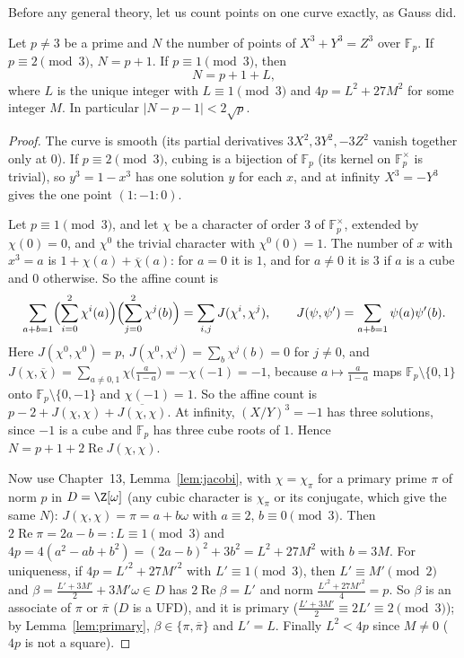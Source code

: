 Before any general theory, let us count points on one curve exactly, as Gauss did.

\begin{proposition}[Gauss]\label{prop:gausscubic}
Let $p\ne3$ be a prime and $N$ the number of points of $X^3+Y^3=Z^3$ over $\mathbb F_p$. If $p\equiv2\pmod3$, $N=p+1$. If $p\equiv1\pmod3$, then
\[
N=p+1+L,
\]
where $L$ is the unique integer with $L\equiv1\pmod3$ and $4p=L^2+27M^2$ for some integer $M$. In particular $|N-p-1|<2\sqrt p$.
\end{proposition}
\begin{proof}
The curve is smooth (its partial derivatives $3X^2,3Y^2,-3Z^2$ vanish together only at $0$). If $p\equiv2\pmod3$, cubing is a bijection of $\mathbb F_p$
(its kernel on $\mathbb F_p^\times$ is trivial), so $y^3=1-x^3$ has one solution $y$ for each $x$, and at infinity $X^3=-Y^3$ gives the one point $(1:-1:0)$.

Let $p\equiv1\pmod3$, and let $\chi$ be a character of order $3$ of $\mathbb F_p^\times$, extended by $\chi(0)=0$, and $\chi^0$ the trivial character with
$\chi^0(0)=1$. The number of $x$ with $x^3=a$ is $1+\chi(a)+\overline\chi(a)$: for $a=0$ it is $1$, and for $a\ne0$ it is $3$ if $a$ is a cube and $0$ otherwise.
So the affine count is
\[
\sum_{a+b=1}\Bigl(\sum_{i=0}^2\chi^i(a)\Bigr)\Bigl(\sum_{j=0}^2\chi^j(b)\Bigr)=\sum_{i,j}J(\chi^i,\chi^j),\qquad J(\psi,\psi')=\sum_{a+b=1}\psi(a)\psi'(b).
\]
Here $J(\chi^0,\chi^0)=p$, $J(\chi^0,\chi^j)=\sum_b\chi^j(b)=0$ for $j\ne0$, and $J(\chi,\overline\chi)=\sum_{a\ne0,1}\chi\bigl(\frac a{1-a}\bigr)=-\chi(-1)=-1$,
because $a\mapsto\frac a{1-a}$ maps $\mathbb F_p\setminus\{0,1\}$ onto $\mathbb F_p\setminus\{0,-1\}$ and $\chi(-1)=1$. So the affine count is
$p-2+J(\chi,\chi)+\overline{J(\chi,\chi)}$. At infinity, $(X/Y)^3=-1$ has three solutions, since $-1$ is a cube and $\mathbb F_p$ has three cube roots of $1$.
Hence $N=p+1+2\operatorname{Re}J(\chi,\chi)$.

Now use Chapter~13, Lemma~\ref{lem:jacobi}, with $\chi=\chi_\pi$ for a primary prime $\pi$ of norm $p$ in $D=\Z[\omega]$ (any cubic character is $\chi_\pi$ or its
conjugate, which give the same $N$): $J(\chi,\chi)=\pi=a+b\omega$ with $a\equiv2$, $b\equiv0\pmod3$. Then $2\operatorname{Re}\pi=2a-b=:L\equiv1\pmod3$ and
$4p=4(a^2-ab+b^2)=(2a-b)^2+3b^2=L^2+27M^2$ with $b=3M$. For uniqueness, if $4p=L'^2+27M'^2$ with $L'\equiv1\pmod 3$, then $L'\equiv M'\pmod2$ and
$\beta=\frac{L'+3M'}2+3M'\omega\in D$ has $2\operatorname{Re}\beta=L'$ and norm $\frac{L'^2+27M'^2}4=p$. So $\beta$ is an associate of $\pi$ or $\overline\pi$
($D$ is a UFD), and it is primary ($\frac{L'+3M'}2\equiv2L'\equiv2\pmod3$); by Lemma~\ref{lem:primary}, $\beta\in\{\pi,\overline\pi\}$ and $L'=L$. Finally
$L^2<4p$ since $M\ne0$ ($4p$ is not a square).
\end{proof}

